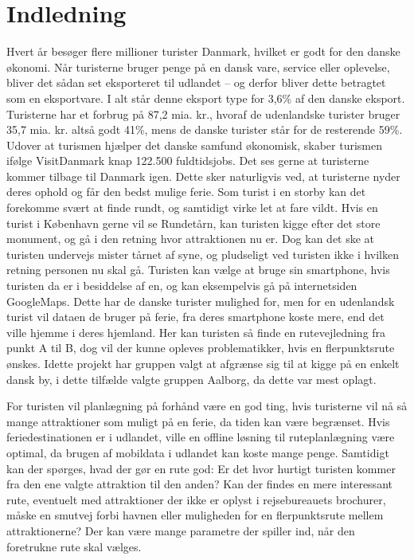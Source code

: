 \chapter{Indledning}

Hvert år besøger flere millioner turister Danmark, hvilket er godt for den danske økonomi. Når turisterne bruger penge på en dansk vare, service eller oplevelse, bliver det sådan set eksporteret til udlandet – og derfor bliver dette betragtet som en eksportvare. I alt står denne eksport type for 3,6\% af den danske eksport. Turisterne har et forbrug på 87,2 mia. kr., hvoraf de udenlandske turister bruger 35,7 mia. kr. altså godt 41\%, mens de danske turister står for de resterende 59\%. Udover at turismen hjælper det danske samfund økonomisk, skaber turismen ifølge VisitDanmark knap 122.500 fuldtidsjobs. \citep{faktaogtalVD}  \newline
Det ses gerne at turisterne kommer tilbage til Danmark igen. Dette sker naturligvis ved, at turisterne nyder deres ophold og får den bedst mulige ferie. Som turist i en storby kan det forekomme svært at finde rundt, og samtidigt virke let at fare vildt. Hvis en turist i København gerne vil se Rundetårn, kan turisten kigge efter det store monument, og gå i den retning hvor attraktionen nu er. Dog kan det ske at turisten undervejs mister tårnet af syne, og pludseligt ved turisten ikke i hvilken retning personen nu skal gå. Turisten kan vælge at bruge sin smartphone, hvis turisten da er i besiddelse af en, og kan eksempelvis gå på internetsiden GoogleMaps. Dette har de danske turister mulighed for, men for en udenlandsk turist vil dataen de bruger på ferie, fra deres smartphone koste mere, end det ville hjemme i deres hjemland\citep{VF}.  Her kan turisten så finde en rutevejledning fra punkt A til B, dog vil der kunne opleves problematikker, hvis en flerpunktsrute ønskes. Idette projekt har gruppen valgt at afgrænse sig til at kigge på en enkelt dansk by, i dette tilfælde valgte gruppen Aalborg, da dette var mest oplagt.  \newline

For turisten vil planlægning på forhånd være en god ting, hvis turisterne vil nå så mange attraktioner som muligt på en ferie, da tiden kan være begrænset\citep{YouthCentral}. Hvis feriedestinationen er i udlandet, ville en offline løsning til ruteplanlægning være optimal, da brugen af mobildata i udlandet kan koste mange penge\citep {TDC}.\newline
Samtidigt kan der spørges, hvad der gør en rute god: Er det hvor hurtigt turisten kommer fra den ene valgte attraktion til den anden? Kan der findes en mere interessant rute, eventuelt med attraktioner der ikke er oplyst i rejsebureauets brochurer, måske en smutvej forbi havnen eller muligheden for en flerpunktsrute mellem attraktionerne? Der kan være mange parametre der spiller ind, når den foretrukne rute skal vælges. \newline

